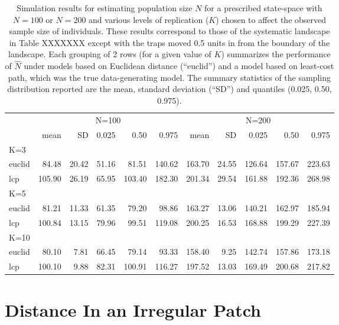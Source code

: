 \begin{table}[htp]
{\tiny
\caption{Simulation results for estimating population size $N$ for a prescribed state-space with
$N=100$ or $N=200$ and various levels of replication ($K$) chosen to affect the observed sample
size of individuals. These results correspond to those of the
systematic landscape in Table XXXXXXX  except with the traps
moved 0.5 units in from the boundary of the landscape.
Each grouping of 2 rows (for a given value of $K$) summarizes the
performance of $\hat{N}$ under models based on
Euclidean distance  (``euclid'') and
a model based on least-cost path, which was the true data-generating model.
The summary statistics of the
sampling distribution reported are the mean, standard deviation
(``SD'') and quantiles (0.025, 0.50, 0.975).
}
\begin{tabular}{l|rrrrr|rrrrr}
         & \multicolumn{5}{c}{N=100   } & \multicolumn{5}{c}{N=200  }  \\
         &   mean &  SD  & 0.025 & 0.50 & 0.975  & mean  & SD   & 0.025 & 0.50  & 0.975 \\ \hline
K=3      &        &      &       &      &        &       &      &       &       &       \\
euclid   &   84.48& 20.42& 51.16 & 81.51& 140.62 &163.70 &24.55 &126.64 &157.67 &223.63 \\
lcp      &  105.90& 26.19& 65.95 &103.40& 182.30 &201.34 &29.54 &161.88 &192.36 &268.98\\
K=5      &        &      &       &      &        &       &      &       &       &       \\
euclid   & 81.21  &11.33 &61.35  &79.20 & 98.86  &163.27 &13.06 &140.21 &162.97 &185.94\\
lcp      & 100.84 &13.15 &79.96  &99.51 &119.08  &200.25 &16.53 &168.88 &199.29 &227.39\\
K=10     &        &      &       &      &        &       &      &       &       &       \\
euclid   &  80.10 & 7.81 &66.45  &79.14 &93.33   &158.40 & 9.25 &142.74 &157.86 &173.18\\
lcp      & 100.10 & 9.88 &82.31  &100.91&116.27  &197.52 &13.03 &169.49 &200.68 &217.82\\ \hline
\end{tabular}
}
\label{tab.results3}
\end{table}





\section{Distance In an Irregular Patch}
\label{ecoldist.sec.buffer}

